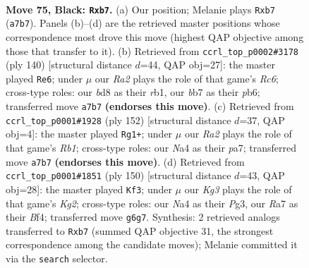 \documentclass[11pt]{article}
\begin{document}
\clearpage

\begin{figure}[p]\centering
\begin{subfigure}{0.46\textwidth}\centering
\resizebox{\linewidth}{!}{%
\newchessgame
\chessboard[
  setfen={3B4/rB6/3p2kp/4p1b1/n3P2p/3K1P1R/8/8 b - - 20 75},
  showmover=false,
  pgfstyle=straightmove, color=movearrow, markmove={a7-b7}
]}
\caption{}
\end{subfigure}\hfill
\begin{subfigure}{0.46\textwidth}\centering
\resizebox{\linewidth}{!}{%
\newchessgame
\chessboard[
  setfen={8/6k1/1pR5/pBb3p1/P7/4P3/5PK1/1r6 w - - 24 71},
  showmover=false,
  pgfstyle=straightmove, color=movearrow, markmove={c6-e6}
]}
\caption{}
\end{subfigure}
\\[4pt]
\begin{subfigure}{0.46\textwidth}\centering
\resizebox{\linewidth}{!}{%
\newchessgame
\chessboard[
  setfen={8/p1r5/Pb6/4pBk1/4P2p/5K1P/5P2/1R6 w - - 6 77},
  showmover=false,
  pgfstyle=straightmove, color=movearrow, markmove={b1-g1}
]}
\caption{}
\end{subfigure}\hfill
\begin{subfigure}{0.46\textwidth}\centering
\resizebox{\linewidth}{!}{%
\newchessgame
\chessboard[
  setfen={8/5k2/R2P2p1/3rbp1p/5B1P/6P1/5PK1/8 w - - 69 76},
  showmover=false,
  pgfstyle=straightmove, color=movearrow, markmove={g2-f3}
]}
\caption{}
\end{subfigure}
\caption{\textbf{Move 75, Black: \texttt{Rxb7}.} (a) Our position; Melanie plays \texttt{Rxb7} (\texttt{a7b7}). Panels (b)--(d) are the retrieved master positions whose correspondence most drove this move (highest QAP objective among those that transfer to it). (b) Retrieved from \texttt{ccrl\_top\_p0002\#3178} (ply 140) [structural distance $d$=44, QAP obj=27]: the master played \texttt{Re6}; under $\mu$ our \emph{Ra2} plays the role of that game's \emph{Rc6}; cross-type roles: our \emph{b}d8 as their \emph{r}b1, our \emph{b}b7 as their \emph{p}b6; transferred move \texttt{a7b7} \textbf{(endorses this move)}. (c) Retrieved from \texttt{ccrl\_top\_p0001\#1928} (ply 152) [structural distance $d$=37, QAP obj=4]: the master played \texttt{Rg1+}; under $\mu$ our \emph{Ra2} plays the role of that game's \emph{Rb1}; cross-type roles: our \emph{N}a4 as their \emph{p}a7; transferred move \texttt{a7b7} \textbf{(endorses this move)}. (d) Retrieved from \texttt{ccrl\_top\_p0001\#1851} (ply 150) [structural distance $d$=43, QAP obj=28]: the master played \texttt{Kf3}; under $\mu$ our \emph{Kg3} plays the role of that game's \emph{Kg2}; cross-type roles: our \emph{N}a4 as their \emph{P}g3, our \emph{R}a7 as their \emph{B}f4; transferred move \texttt{g6g7}. Synthesis: 2 retrieved analogs transferred to \texttt{Rxb7} (summed QAP objective 31, the strongest correspondence among the candidate moves); Melanie committed it via the \texttt{search} selector.}
\label{fig:thought-m149}
\end{figure}
\end{document}
